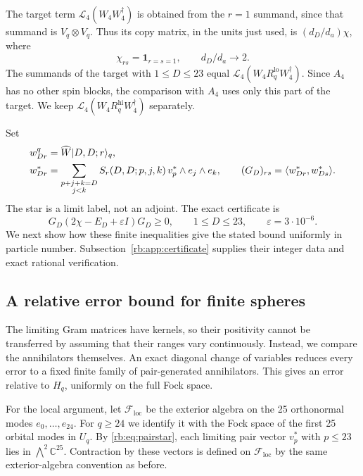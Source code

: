 The target term $\mathcal L_4(W_4W_4^\dagger)$ is obtained from the $r=1$ summand, since that summand is $V_q\otimes V_q$. Thus its copy matrix, in the units just used, is $(d_D/d_a)\chi$, where
\[
 \chi_{rs}=\mathbf1_{r=s=1},\qquad d_D/d_a\longrightarrow2.
\]
The summands of the target with $1\le D\le23$ equal
$\mathcal L_4(W_4R_q^{\mathrm{lo}}W_4^\dagger)$.
Since $A_4$ has no other spin blocks, the comparison with $A_4$ uses only
this part of the target. We keep
$\mathcal L_4(W_4R_q^{\mathrm{hi}}W_4^\dagger)$ separately.

Set
\begin{align}
 w_{Dr}^q&=\widehat W\lvert D,D;r\rangle_q,\label{rb:eq:wq}\\
 w_{Dr}^*&=\sum_{\substack{p+j+k=D\\j<k}}
 S_r(D,D;p,j,k)\,v_p^*\wedge e_j\wedge e_k,\qquad
 (G_D)_{rs}=\langle w_{Dr}^*,w_{Ds}^*\rangle.\label{rb:eq:wstar}
\end{align}
The star is a limit label, not an adjoint. The exact certificate is
\begin{equation}\label{rb:eq:4certificate}
 G_D(2\chi-E_D+\varepsilon I)G_D\ge0,
 \qquad 1\le D\le23,\qquad \varepsilon=3\cdot10^{-6}.
\end{equation}
We next show how these finite inequalities give the stated bound uniformly
in particle number. Subsection~\ref{rb:app:certificate} supplies their
integer data and exact rational verification.

\subsection{A relative error bound for finite spheres}
\label{rb:sec:transfer}
The limiting Gram matrices have kernels, so their positivity cannot be
transferred by assuming that their ranges vary continuously.  Instead, we
compare the annihilators themselves.  An exact diagonal change of variables
reduces every error to a fixed finite family of pair-generated annihilators.
This gives an error relative to $H_q$, uniformly on the full Fock space.

For the local argument, let $\mathcal F_{\mathrm{loc}}$ be the exterior
algebra on the 25 orthonormal modes $e_0,\ldots,e_{24}$.
For $q\ge24$ we identify it with the Fock space of the first 25 orbital
modes in $U_q$. By \eqref{rb:eq:pairstar}, each limiting pair vector $v_p^*$
with $p\le23$ lies in $\bigwedge^2\mathbb C^{25}$.
Contraction by these vectors is defined on $\mathcal F_{\mathrm{loc}}$
by the same exterior-algebra convention as before.

